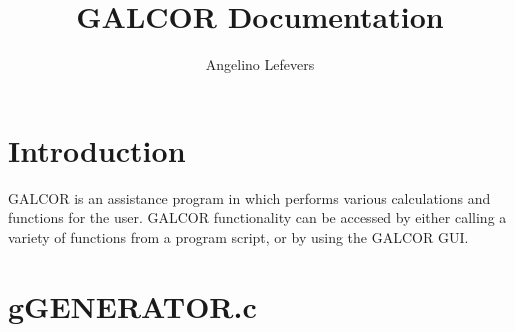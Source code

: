 \documentclass{article}
\begin{document}
\title{GALCOR Documentation}
\author{Angelino Lefevers}
\maketitle
\thispagestyle{empty}
\cleardoublepage
\tableofcontents
\thispagestyle{empty}
\cleardoublepage
\setcounter{page}{1}
\section{Introduction}
GALCOR is an assistance program in which performs various calculations and functions for the user. GALCOR functionality can be accessed by either calling a variety of functions from a program script, or by using the GALCOR GUI.
\cleardoublepage
\cleardoublepage
\section{gGENERATOR.c}

\end{document}
